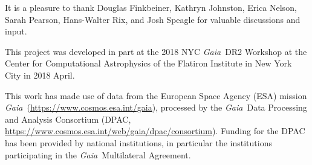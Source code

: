 \documentclass[12pt, modern]{aastex62}
\newcommand{\acronym}[1]{{\small{#1}}}
\newcommand{\Gaia}{\textsl{Gaia}}
\begin{document}
\acknowledgements
It is a pleasure to thank
Douglas Finkbeiner,
Kathryn Johnston,
Erica Nelson,
Sarah Pearson,
Hans-Walter Rix,
and
Josh Speagle
for valuable discussions and input.

This project was developed in part at the
2018 \acronym{NYC} \Gaia\ \acronym{DR2} Workshop
at the Center for Computational Astrophysics of the Flatiron Institute
in New York City in 2018 April.

This work has made use of data from the European Space Agency (\acronym{ESA}) mission
\Gaia\ (\url{https://www.cosmos.esa.int/gaia}), processed by the \Gaia\ Data
Processing and Analysis Consortium (\acronym{DPAC},
\url{https://www.cosmos.esa.int/web/gaia/dpac/consortium}). Funding for the
\acronym{DPAC}
has been provided by national institutions, in particular the institutions
participating in the \Gaia\ Multilateral Agreement.



\end{document}

